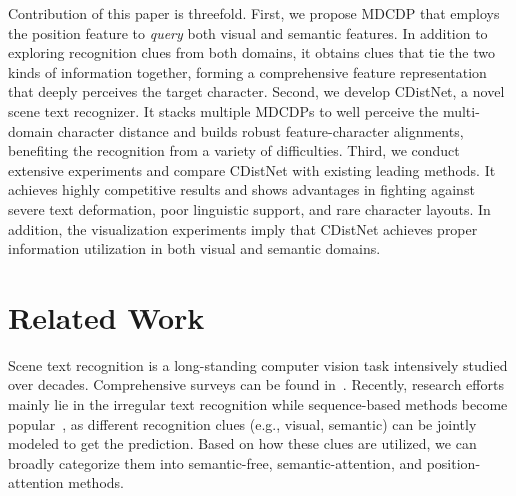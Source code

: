 Contribution of this paper is threefold. First, we propose MDCDP that employs the position feature to \emph{query} both visual and semantic features. In addition to exploring recognition clues from both domains, it obtains clues that tie the two kinds of information together, forming a comprehensive feature representation that deeply perceives the target character. Second, we develop CDistNet, a novel scene text recognizer. It stacks multiple MDCDPs to well perceive the multi-domain character distance and builds robust feature-character alignments, benefiting the recognition from a variety of difficulties. Third, we conduct extensive experiments and compare CDistNet with existing leading methods. It achieves highly competitive results and shows advantages in fighting against severe text deformation, poor linguistic support, and rare character layouts. In addition, the visualization experiments imply that CDistNet achieves proper information utilization in both visual and semantic domains.


\section{Related Work}
Scene text recognition is a long-standing computer vision task intensively studied over decades. Comprehensive surveys can be found in~\citep{ye2014text,long2021str_era,Chen2021text}. Recently, research efforts mainly lie in the irregular text recognition while sequence-based methods become popular~\citep{bhunia2021jvsr,masktextspotterlyu2018mask,jaderberg2016reading,rodriguez2015label,Baekwhats_wrong_19ICCV,cheng2018aon,nguyen2021dictionary,luo2021separating}, as different recognition clues (e.g., visual, semantic) can be jointly modeled to get the prediction. Based on how these clues are utilized, we can broadly categorize them into semantic-free, semantic-attention, and position-attention methods.

